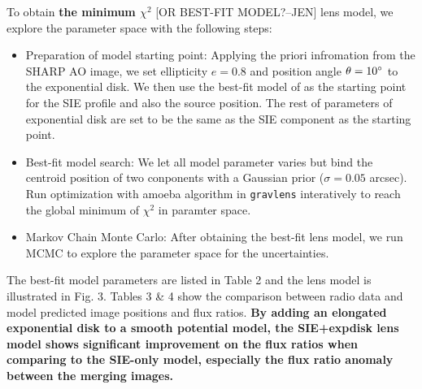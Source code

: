 \documentclass[useAMS,usenatbib]{mn2e}
\begin{document}
To obtain \textbf{the minimum $\chi^2$} [OR BEST-FIT MODEL?--JEN] lens model, we explore the parameter space with the following steps: 
\begin{itemize}
\item Preparation of model starting point: Applying the priori infromation from the SHARP AO image, we set ellipticity $e=0.8$ and position angle $\theta=10 \hbox{$^\circ$}$ to the exponential disk. We then use the best-fit model of \citet{Marlow99} as the starting point for the SIE profile and also the source position. The rest of parameters of exponential disk are set to be the same as the SIE component as the starting point.
\item Best-fit model search: We let all model parameter varies but bind the centroid position of two conponents with a Gaussian prior ($\sigma = 0.05 $ arcsec). Run optimization with amoeba algorithm in {\tt gravlens} interatively to reach the global minimum of $\chi^2$ in paramter space.
\item Markov Chain Monte Carlo: After obtaining the best-fit lens model, we run MCMC to explore the parameter space for the uncertainties.
\end{itemize}

The best-fit model parameters are listed in Table 2 and the lens model is illustrated in Fig. 3. 
Tables 3 \& 4 show the comparison between radio data and model predicted image positions and flux ratios.  
\textbf{By adding an elongated exponential disk to a smooth potential model, the SIE+expdisk lens model shows significant improvement on the flux ratios when comparing to the SIE-only model, especially the flux ratio anomaly between the merging images.}
\end{document}
